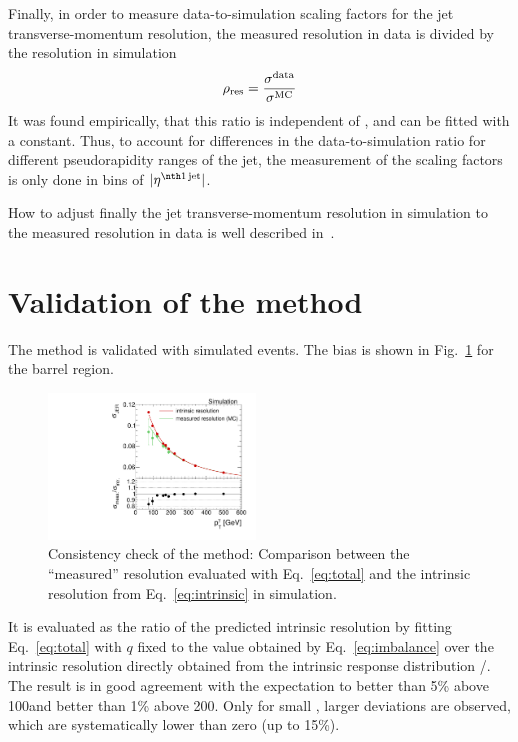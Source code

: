 Finally, in order to measure data-to-simulation scaling factors \rhores for the jet transverse-momentum resolution, the measured resolution in data is divided by the resolution in simulation
\begin{equation}
\rho_\mathrm{res} = \frac{\sigma^{\text{data}}}{\sigma^{\text{MC}}}
\end{equation}
It was found empirically, that this ratio is independent of \ptgamma, and can be fitted with a constant.
Thus, to account for differences in the data-to-simulation ratio for different pseudorapidity ranges of the jet, the measurement of the scaling factors is only done in bins of $|\etafirstjet|$.

How to adjust finally the jet transverse-momentum resolution in simulation to the measured resolution in data is well described in~\cite{bib:Matthias_Thesis}.


\FloatBarrier
\section{Validation of the method}
The method is validated with simulated events. 
The bias  is shown in Fig.~\ref{fig:MCClosure} for the barrel region. 
\begin{figure}[b]
  \centering
    \includegraphics[width=0.49\textwidth]{figures/resolution/methodology/MCClosure_for_1_eta_bin_RMS99.pdf}
  \caption{Consistency check of the method: Comparison between the ``measured'' resolution evaluated with Eq.~\eqref{eq:total} and the intrinsic resolution from Eq.~\eqref{eq:intrinsic} in simulation.}  
  \label{fig:MCClosure}
\end{figure}
It is evaluated as the ratio of the predicted intrinsic resolution by fitting Eq.~\eqref{eq:total} with $q$ fixed to the value obtained by Eq.~\eqref{eq:imbalance} over the intrinsic resolution directly obtained from the intrinsic response distribution \ptrecojet/\ptgenjet.
The result is in good agreement with the expectation to better than 5\% above 100\gev and better than 1\% above 200\gev.
Only for small \pt, larger deviations are observed, which are systematically lower than zero (up to 15\%).

